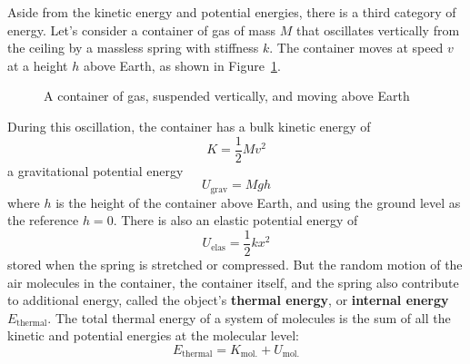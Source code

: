 Aside from the kinetic energy and potential energies, there is a third category
of energy.
Let's consider a container of gas of mass $M$ that oscillates vertically from
the ceiling by a massless spring with stiffness $k$. The container moves at
speed $v$ at a height $h$ above Earth, as shown in Figure~\ref{fig:gas}.
\begin{figure}[ht]
  \centering
  \caption{A container of gas, suspended vertically, and moving above Earth}
  \label{fig:gas}
\end{figure}
During this oscillation, the container has a bulk kinetic energy of
\begin{equation*}
  K=\dfrac12 Mv^2
\end{equation*}
a gravitational potential energy
\begin{equation*}
  U_\text{grav}=Mgh
\end{equation*}
where $h$ is the height of the container above Earth, and using the ground
level as the reference $h=0$. There is also an elastic potential energy of
\begin{equation*}
  U_\text{elas}=\frac12kx^2
\end{equation*}
stored when the spring is stretched or compressed. But the random motion of
the air molecules in the container, the container itself, and the spring also
contribute to additional energy, called the object's \textbf{thermal energy}, or
\textbf{internal energy} $E_\text{thermal}$. The total thermal energy of a
system of molecules is the sum of all the kinetic and potential energies at the
molecular level:
\begin{equation}
  E_\text{thermal}=K_\text{mol.} + U_\text{mol.}
\end{equation}
